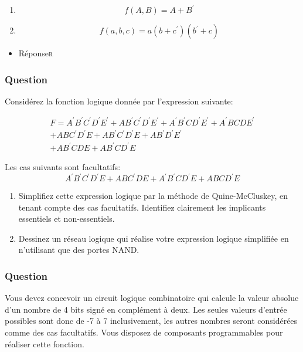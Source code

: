 \documentclass[11pt]{article}
\begin{document}
\begin{enumerate}
\item $$f(A, B) = A + B^{\prime}$$

\item $$f(a, b, c) = a(b+c^{\prime})(b^{\prime}+c)$$
\end{enumerate}

\begin{itemize}
\item Réponse\hfill{}\textsc{r}
\label{sec:org2774d85}
\end{itemize}

\subsubsection*{Question}
\label{sec:org18e50ac}
Considérez la fonction logique donnée par l'expression suivante:

\begin{multline*}
F = A^{\prime} B^{\prime} C^{\prime} D^{\prime} E^{\prime} + {A} B^{\prime} C^{\prime} D^{\prime} E^{\prime} + A^{\prime} B^{\prime} {C} D^{\prime} E^{\prime} + A^{\prime} {B} {C} {D} E^{\prime} \\ + {A} {B} C^{\prime} D^{\prime} {E} + {A} B^{\prime} C^{\prime} D^{\prime} {E} + {A} B^{\prime} D^{\prime} E^{\prime} \\ + {A} B^{\prime} {C} {D} {E} + {A} B^{\prime}  {C} D^{\prime} {E}
\end{multline*}

Les cas suivants sont facultatifs:
\begin{displaymath}
A^{\prime} B^{\prime} C^{\prime} D^{\prime} {E} + {A} {B} C^{\prime} {D} {E} +  A^{\prime}B^{\prime} {C} D^{\prime} {E} + {A} {B} {C} D^{\prime} {E}
\end{displaymath}

\begin{enumerate}
\item Simplifiez cette expression logique par la méthode de
Quine-McCluskey, en tenant compte des cas facultatifs. Identifiez
clairement les implicants essentiels et non-essentiels.

\item Dessinez un réseau logique qui réalise votre expression logique
simplifiée en n'utilisant que des portes NAND.
\end{enumerate}

\subsubsection*{Question}
\label{sec:org1f6f0b8}
Vous devez concevoir un circuit logique combinatoire qui calcule la
valeur absolue d'un nombre de 4 bits signé en complément à deux. Les
seules valeurs d'entrée possibles sont donc de -7 à 7 inclusivement,
les autres nombres seront considérées comme des cas facultatifs. Vous
disposez de composants programmables pour réaliser cette fonction.
\end{document}
